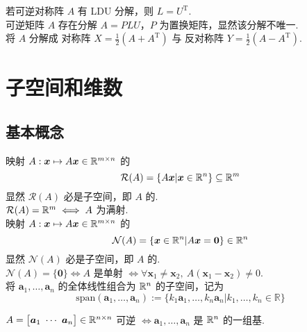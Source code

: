 \documentclass[./main.tex]{subfiles}
\begin{document}
若可逆对称阵 $A$ 有 LDU 分解，则 $L=U^{\mathrm{T}}$. \\

可逆矩阵 $A$ 存在分解 $A=PLU$，$P$ 为置换矩阵，显然该分解不唯一. \\

将 $A$ 分解成 对称阵 $X=\frac{1}{2}(A+A^{\mathrm{T}})$ 与 反对称阵 $Y=\frac{1}{2}(A-A^{\mathrm{T}})$.

\section{子空间和维数}

\subsection{基本概念}

映射 $A:\bm{x}\mapsto A\bm{x}\in\mathbb{R}^{m\times n}$ 的
\begin{equation}
    \mathcal{R}(A)=\{A\bm{x}|\bm{x}\in\mathbb{R}^{n}\}\subseteq\mathbb{R}^{m}
\end{equation}
显然 $\mathcal{R}(A)$ 必是子空间，即 $A$ 的. \\

 $\mathcal{R}(A)=\mathbb{R}^{m}\iff A$ 为满射. \\

映射 $A:\bm{x}\mapsto A\bm{x}\in\mathbb{R}^{m\times n}$ 的
\begin{equation}
    \mathcal{N}(A)=\{\bm{x}\in\mathbb{R}^{n}|A\bm{x}=\bm{0}\}\in\mathbb{R}^{n}
\end{equation}
显然 $\mathcal{N}(A)$ 必是子空间，即 $A$ 的. \\

 $\mathcal{N}(A)=\{\bm{0}\}\iff A$ 是单射 $\iff \forall\bm{x}_1\neq\bm{x}_2,\ A(\bm{x}_1-\bm{x}_2)\neq 0$. \\

将 $\bm{a}_1,\dots,\bm{a}_n$ 的全体线性组合为 $\mathbb{R}^{n}$ 的子空间，记为
\begin{equation}
    \mathrm{span}(\bm{a}_1,\dots,\bm{a}_n):=\{k_1\bm{a}_1,\dots,k_n\bm{a}_n|k_1,\dots,k_n\in\mathbb{R}\}
\end{equation}

$A=\big[\bm{a}_1\ \cdots\ \bm{a}_n\big]\in\rlinsp{n\times n}$ 可逆 $\iff \bm{a}_1,\dots,\bm{a}_n$ 是 $\mathbb{R}^{n}$ 的一组基.
\end{document}
